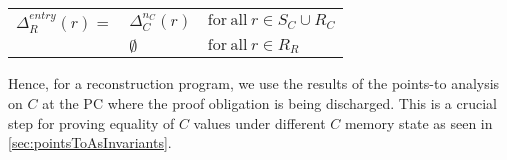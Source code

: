 \begin{center}
\begin{tabular}{rll}
$\Delta^{entry}_R(r)=$ & $\Delta^{n_C}_C(r)$ & $\mathrm{for\ all}\ r \in{}S_C\cup{}R_C$ \\
& $\emptyset$ & $\mathrm{for\ all}\ r \in{}R_R$ \\
\end{tabular}
\end{center}

Hence, for a reconstruction program, we use the results of the points-to analysis on $C$ at the PC where
the proof obligation is being discharged. This is a crucial step for proving equality of $C$ values
under different $C$ memory state as seen in \cref{sec:pointsToAsInvariants}.

